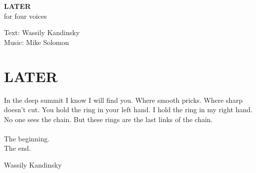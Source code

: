 \documentclass[letterpaper]{book}
\begin{document}
\begin{titlepage}
\begin{flushright}
{\Huge \bfseries LATER \\ }
{\large for four voices}
\par
{}
{\large Text: Wassily Kandinsky \\}
{\large Music: Mike Solomon \\}
\end{flushright}
\end{titlepage}
\thispagestyle{empty} 
\frontmatter
\clearpage
{}
\section*{LATER}
In the deep summit I know I will find you. Where smooth pricks. Where sharp doesn't cut. You hold the 
ring in your left hand. I hold the ring in my right hand. No one sees the chain. But these rings are the 
last links of the chain.\\\hfill\\
The beginning.\\
The end.\\
\begin{flushright}
Wassily Kandinsky
\end{flushright}
\clearpage
{}
\end{document}

